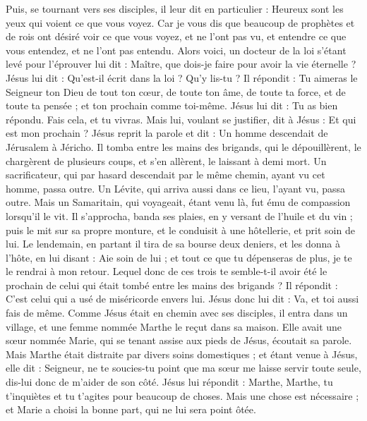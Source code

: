\begin{multicols}{2}
Puis, se tournant vers ses disciples, il leur dit en particulier : Heureux sont les yeux qui voient ce que vous voyez.
Car je vous dis que beaucoup de prophètes et de rois ont désiré voir ce que vous voyez, et ne l’ont pas vu, et entendre ce que vous entendez, et ne l’ont pas entendu.
Alors voici, un docteur de la loi s'étant levé pour l'éprouver lui dit : Maître, que dois-je faire pour avoir la vie éternelle ?
Jésus lui dit : Qu'est-il écrit dans la loi ? Qu’y lis-tu ?
Il répondit : Tu aimeras le Seigneur ton Dieu de tout ton cœur, de toute ton âme, de toute ta force, et de toute ta pensée ; et ton prochain comme toi-même.
Jésus lui dit : Tu as bien répondu. Fais cela, et tu vivras.
Mais lui, voulant se justifier, dit à Jésus : Et qui est mon prochain ?
Jésus reprit la parole et dit : Un homme descendait de Jérusalem à Jéricho. Il tomba entre les mains des brigands, qui le dépouillèrent, le chargèrent de plusieurs coups, et s’en allèrent, le laissant à demi mort.
Un sacrificateur, qui par hasard descendait par le même chemin, ayant vu cet homme, passa outre.
Un Lévite, qui arriva aussi dans ce lieu, l’ayant vu, passa outre.
Mais un Samaritain, qui voyageait, étant venu là, fut ému de compassion lorsqu’il le vit.
Il s'approcha, banda ses plaies, en y versant de l'huile et du vin ; puis le mit sur sa propre monture, et le conduisit à une hôtellerie, et prit soin de lui.
Le lendemain, en partant il tira de sa bourse deux deniers, et les donna à l'hôte, en lui disant : Aie soin de lui ; et tout ce que tu dépenseras de plus, je te le rendrai à mon retour.
Lequel donc de ces trois te semble-t-il avoir été le prochain de celui qui était tombé entre les mains des brigands ?
Il répondit : C’est celui qui a usé de miséricorde envers lui. Jésus donc lui dit : Va, et toi aussi fais de même.
Comme Jésus était en chemin avec ses disciples, il entra dans un village, et une femme nommée Marthe le reçut dans sa maison.
Elle avait une sœur nommée Marie, qui se tenant assise aux pieds de Jésus, écoutait sa parole.
Mais Marthe était distraite par divers soins domestiques ; et étant venue à Jésus, elle dit : Seigneur, ne te soucies-tu point que ma sœur me laisse servir toute seule, dis-lui donc de m’aider de son côté.
Jésus lui répondit : Marthe, Marthe, tu t'inquiètes et tu t'agites pour beaucoup de choses.
Mais une chose est nécessaire ; et Marie a choisi la bonne part, qui ne lui sera point ôtée.

\end{multicols}

